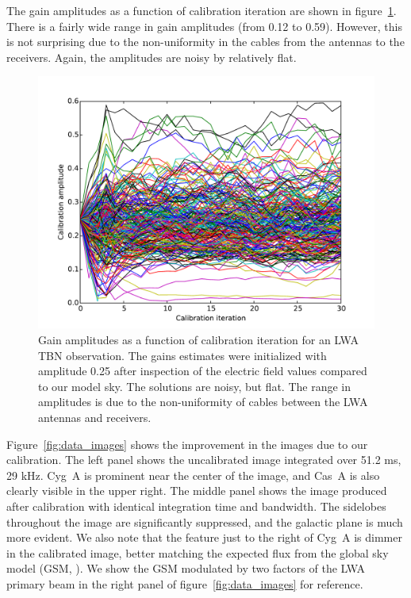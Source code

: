 \documentclass[a4paper,fleqn,usenatbib]{../mnras}
\begin{document}
The gain amplitudes as a function of calibration iteration are shown in figure~\ref{fig:data_amp}. There is a fairly wide range in gain amplitudes (from 0.12 to 0.59). However, this is not surprising due to the non-uniformity in the cables from the antennas to the receivers. Again, the amplitudes are noisy by relatively flat.

\begin{figure}
\begin{center}
\includegraphics[width=\columnwidth]{figures/cal_paper_data_amps.pdf}
\caption{Gain amplitudes as a function of calibration iteration for an LWA TBN observation. The gains estimates were initialized with amplitude 0.25 after inspection of the electric field values compared to our model sky. The solutions are noisy, but flat. The range in amplitudes is due to the non-uniformity of cables between the LWA antennas and receivers.
}
\label{fig:data_amp}
\end{center}
\end{figure}

Figure~\ref{fig:data_images} shows the improvement in the images due to our calibration. The left panel shows the uncalibrated image integrated over 51.2 ms, 29 kHz. Cyg~A is prominent near the center of the image, and Cas~A is also clearly visible in the upper right. The middle panel shows the image produced after calibration with identical integration time and bandwidth. The sidelobes throughout the image are significantly suppressed, and the galactic plane is much more evident. We also note that the feature just to the right of Cyg~A is dimmer in the calibrated image, better matching the expected flux from the global sky model (GSM, \citealt{deo08}). We show the GSM modulated by two factors of the LWA primary beam in the right panel of figure~\ref{fig:data_images} for reference.
\end{document}

